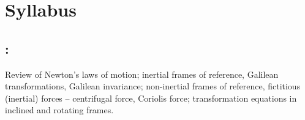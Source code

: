 \section*{Syllabus}

    \subsection*{\topicSubTitle: \topicTitle}
        Review of Newton's laws of motion; inertial frames of reference, Galilean transformations, Galilean invariance; non-inertial frames of reference, fictitious (inertial) forces -- centrifugal force, Coriolis force; transformation equations in inclined and rotating frames.